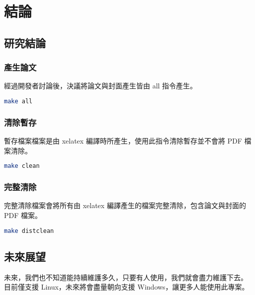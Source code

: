 
\chapter{結論} \label{conclusion_and_future}

\section{研究結論}

\subsection*{產生論文}

經過開發者討論後，決議將論文與封面產生皆由 all 指令產生。

\begin{lstlisting}[language=bash]
    make all
\end{lstlisting}

\subsection*{清除暫存}

暫存檔案檔案是由 xelatex 編譯時所產生，使用此指令清除暫存並不會將 PDF 檔案清除。

\begin{lstlisting}[language=bash]
    make clean
\end{lstlisting}

\subsection*{完整清除}

完整清除檔案會將所有由 xelatex 編譯產生的檔案完整清除，包含論文與封面的 PDF 檔案。

\begin{lstlisting}[language=bash]
    make distclean
\end{lstlisting}

\section{未來展望}

未來，我們也不知道能持續維護多久，只要有人使用，我們就會盡力維護下去。
目前僅支援 Linux，未來將會盡量朝向支援 Windows，讓更多人能使用此專案。
